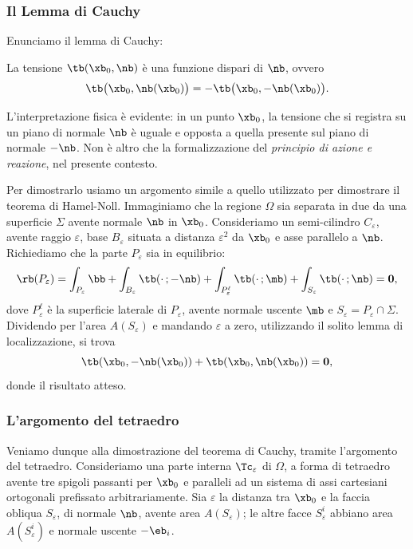 \subsubsection{Il Lemma di Cauchy}
Enunciamo il  lemma di Cauchy: 
\begin{definition}
La tensione $\tb(\xb_0,\nb)$ è una funzione dispari di $\nb$, ovvero
	\begin{equation}\label{lemmaC}
\tb\big(\xb_0,\nb(\xb_0)\big)=-\tb\big(\xb_0,-\nb(\xb_0)\big).
\end{equation} 
\end{definition}
L'interpretazione fisica è evidente: in un punto $\xb_0$, la tensione che si registra su un piano di normale $\nb$ è uguale e opposta a quella presente sul piano di normale $-\nb$. Non è altro che la formalizzazione del \textit{principio di azione e reazione}, nel presente contesto.

Per dimostrarlo usiamo un argomento simile a quello utilizzato per dimostrare il teorema di Hamel-Noll. Immaginiamo che la regione $\Omega$ sia separata in due da una superficie $\Sigma$ avente normale $\nb$ in $\xb_0$.  Consideriamo un semi-cilindro $C_\varepsilon$, avente raggio $\varepsilon$, base $B_\varepsilon$ situata a distanza $\varepsilon^2$ da $\xb_0$ e asse parallelo a $\nb$. Richiediamo che la parte $P_\varepsilon$ sia in equilibrio:
\begin{equation}
\rb(P_\varepsilon)=\int_{P_\varepsilon}\bb+\int_{B_\varepsilon}\tb(\cdot\,; - \nb)+\int_{P^\ell_\varepsilon}\tb(\cdot\,; \mb)+\int_{S_\varepsilon}\tb(\cdot\,; \nb)=\mathbf{0},
\end{equation}
dove $P^\ell_\varepsilon$ è la superficie laterale di $P_\varepsilon$, avente normale uscente $\mb$ e $S_\varepsilon=P_\varepsilon\cap \Sigma$. Dividendo per l'area $A(S_\varepsilon)$ e mandando $\varepsilon$ a zero, utilizzando il solito lemma di localizzazione, si trova
\begin{equation}
\tb(\xb_0, -\nb(\xb_0))+\tb(\xb_0, \nb(\xb_0))=\mathbf{0},
\end{equation}
donde il risultato atteso.

\subsubsection{L'argomento del tetraedro}
Veniamo dunque alla dimostrazione del teorema di Cauchy, tramite l'argomento del tetraedro.
Consideriamo una parte interna $\Tc_\varepsilon$ di $\Omega$, a forma di tetraedro avente tre spigoli passanti per $\xb_0$ e paralleli ad un sistema di assi cartesiani ortogonali prefissato arbitrariamente. Sia $\varepsilon$ la distanza tra $\xb_0$ e la faccia obliqua $S_\varepsilon$, di normale $\nb$, avente area $A(S_\varepsilon)$; le altre facce $S^i_\varepsilon$ abbiano area $A(S^i_\varepsilon)$ e normale uscente $-\eb_i$.

